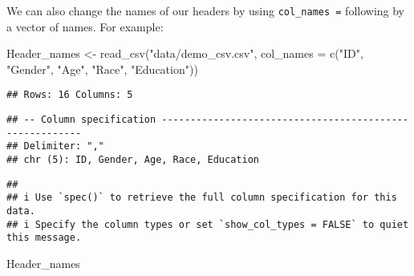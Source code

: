\documentclass[
]{book}
\newenvironment{Shaded}{\begin{snugshade}}{\end{snugshade}}
\newcommand{\AttributeTok}[1]{\textcolor[rgb]{0.77,0.63,0.00}{#1}}
\newcommand{\FunctionTok}[1]{\textcolor[rgb]{0.00,0.00,0.00}{#1}}
\newcommand{\NormalTok}[1]{#1}
\newcommand{\OtherTok}[1]{\textcolor[rgb]{0.56,0.35,0.01}{#1}}
\newcommand{\StringTok}[1]{\textcolor[rgb]{0.31,0.60,0.02}{#1}}
\begin{document}
We can also change the names of our headers by using \texttt{col\_names\ =} following by a vector of names. For example:

\begin{Shaded}
\begin{Highlighting}[]
\NormalTok{Header\_names }\OtherTok{\textless{}{-}} \FunctionTok{read\_csv}\NormalTok{(}\StringTok{"data/demo\_csv.csv"}\NormalTok{,}
                      \AttributeTok{col\_names =} \FunctionTok{c}\NormalTok{(}\StringTok{"ID"}\NormalTok{, }\StringTok{"Gender"}\NormalTok{, }\StringTok{"Age"}\NormalTok{, }\StringTok{"Race"}\NormalTok{, }\StringTok{"Education"}\NormalTok{))}
\end{Highlighting}
\end{Shaded}

\begin{verbatim}
## Rows: 16 Columns: 5
\end{verbatim}

\begin{verbatim}
## -- Column specification --------------------------------------------------------
## Delimiter: ","
## chr (5): ID, Gender, Age, Race, Education
\end{verbatim}

\begin{verbatim}
## 
## i Use `spec()` to retrieve the full column specification for this data.
## i Specify the column types or set `show_col_types = FALSE` to quiet this message.
\end{verbatim}

\begin{Shaded}
\begin{Highlighting}[]
\NormalTok{Header\_names}
\end{Highlighting}
\end{Shaded}
\end{document}

